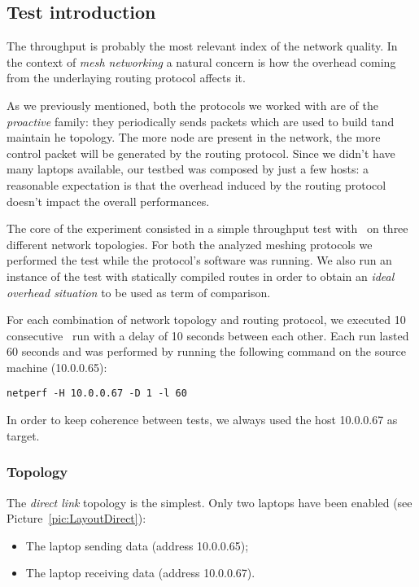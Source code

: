 \clearpage
\subsection{Test introduction}

    The throughput is probably the most relevant index of the network
    quality. In the context of \emph{mesh networking} a natural concern
    is how the overhead coming from the underlaying routing protocol
    affects it.

    As we previously mentioned, both the protocols we worked
    with are of the \emph{proactive} family: they periodically sends
    packets which are used to build tand maintain he topology. The
    more node are present in the network, the more control packet will
    be generated by the routing protocol.
    Since we didn't have many laptops available, our testbed was composed
    by just a few hosts: a reasonable expectation is that the overhead
    induced by the routing protocol doesn't impact the overall
    performances.

    The core of the experiment consisted in a simple throughput test with
    \netperf\ on three different network topologies. For both the
    analyzed meshing protocols we performed the test while the protocol's
    software was running. We also run an instance of the test with
    statically compiled routes in order to obtain an \emph{ideal overhead
    situation} to be used as term of comparison.

    For each combination of network topology and routing protocol, we
    executed 10 consecutive \netperf\ run with a delay of 10 seconds
    between each other. Each run lasted 60 seconds and was performed by
    running the following command on the source machine (10.0.0.65):
\begin{verbatim}
netperf -H 10.0.0.67 -D 1 -l 60
\end{verbatim}

    In order to keep coherence between tests, we always used the host
    10.0.0.67 as target.

    \subsubsection{Topology}

        The \emph{direct link} topology is the simplest. Only two laptops
        have been enabled (see Picture~\ref{pic:LayoutDirect}):
        \begin{itemize}
        \item   The laptop sending data (address 10.0.0.65);
        \item   The laptop receiving data (address 10.0.0.67).
        \end{itemize}

